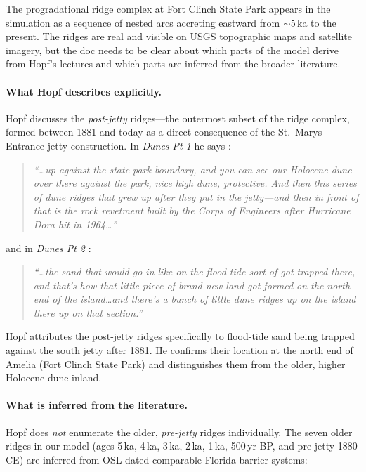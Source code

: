 \documentclass[11pt]{article}
\begin{document}
The progradational ridge complex at Fort Clinch State Park appears in
the simulation as a sequence of nested arcs accreting eastward from
$\sim$5\,ka to the present. The ridges are real and visible on USGS
topographic maps and satellite imagery, but the doc needs to be clear
about which parts of the model derive from Hopf's lectures and which
parts are inferred from the broader literature.

\paragraph{What Hopf describes explicitly.}
Hopf discusses the \emph{post-jetty} ridges---the outermost subset of
the ridge complex, formed between 1881 and today as a direct
consequence of the St.\ Marys Entrance jetty construction. In
\emph{Dunes Pt 1} he says \cite{cn_dunes1}:

\begin{quote}
\itshape
``\ldots up against the state park boundary, and you can see our
Holocene dune over there against the park, nice high dune, protective.
And then this series of dune ridges that grew up after they put in the
jetty---and then in front of that is the rock revetment built by the
Corps of Engineers after Hurricane Dora hit in 1964\ldots''
\end{quote}

\noindent and in \emph{Dunes Pt 2} \cite{cn_dunes2}:

\begin{quote}
\itshape
``\ldots the sand that would go in like on the flood tide sort of got
trapped there, and that's how that little piece of brand new land got
formed on the north end of the island\ldots and there's a bunch of
little dune ridges up on the island there up on that section.''
\end{quote}

Hopf attributes the post-jetty ridges specifically to flood-tide sand
being trapped against the south jetty after 1881. He confirms their
location at the north end of Amelia (Fort Clinch State Park) and
distinguishes them from the older, higher Holocene dune inland.

\paragraph{What is inferred from the literature.}
Hopf does \emph{not} enumerate the older, \emph{pre-jetty} ridges
individually. The seven older ridges in our model (ages 5\,ka, 4\,ka,
3\,ka, 2\,ka, 1\,ka, 500\,yr BP, and pre-jetty 1880 CE) are inferred
from OSL-dated comparable Florida barrier systems:
\end{document}
